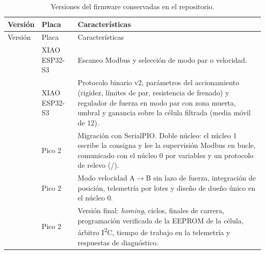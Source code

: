 \begin{longtable}{@{}L{0.27\textwidth}L{0.12\textwidth}L{0.49\textwidth}@{}}
\caption{Versiones del firmware conservadas en el repositorio.}\label{tab:versiones-fw}\\
\toprule
Versión & Placa & Características \\
\midrule
\endfirsthead
\toprule
Versión & Placa & Características \\
\midrule
\endhead
{} & XIAO ESP32-S3 & Escaneo Modbus y selección de modo par o velocidad. \\
 & XIAO ESP32-S3 & Protocolo binario v2, parámetros del accionamiento (rigidez, límites de par, resistencia de frenado) y regulador de fuerza en modo par con zona muerta, umbral y ganancia sobre la célula filtrada (media móvil de 12). \\
 & Pico 2 & Migración con SerialPIO. Doble núcleo: el núcleo 1 escribe la consigna y lee la supervisión Modbus en bucle, comunicado con el núcleo 0 por variables  y un protocolo de relevo (/). \\
 & Pico 2 & Modo velocidad A$\rightarrow$B sin lazo de fuerza, integración de posición, telemetría por lotes y diseño de dueño único en el núcleo 0. \\
 & Pico 2 & Versión final: \emph{homing}, ciclos, finales de carrera, programación verificada de la EEPROM de la célula, árbitro I\textsuperscript{2}C, tiempo de trabajo en la telemetría y respuestas de diagnóstico. \\
\bottomrule
\end{longtable}
